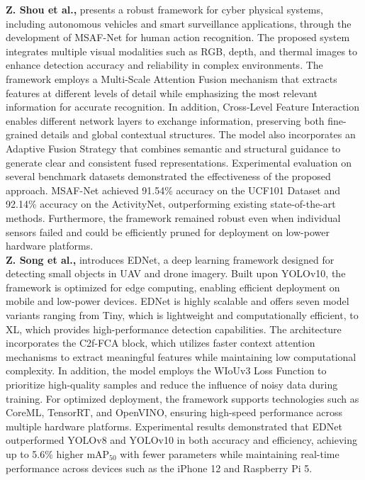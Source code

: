 \textbf{Z. Shou et al.,} presents a robust framework for cyber physical systems, including autonomous vehicles and smart surveillance applications, through the development of MSAF-Net for human action recognition. The proposed system integrates multiple visual modalities such as RGB, depth, and thermal images to enhance detection accuracy and reliability in complex environments. The framework employs a Multi-Scale Attention Fusion mechanism that extracts features at different levels of detail while emphasizing the most relevant information for accurate recognition. In addition, Cross-Level Feature Interaction enables different network layers to exchange information, preserving both fine-grained details and global contextual structures. The model also incorporates an Adaptive Fusion Strategy that combines semantic and structural guidance to generate clear and consistent fused representations. Experimental evaluation on several benchmark datasets demonstrated the effectiveness of the proposed approach. MSAF-Net achieved 91.54\% accuracy on the UCF101 Dataset and 92.14\% accuracy on the ActivityNet, outperforming existing state-of-the-art methods. Furthermore, the framework remained robust even when individual sensors failed and could be efficiently pruned for deployment on low-power hardware platforms. \textbf{\cite{supplementary_paper_6}} \\

\textbf{Z. Song et al.,} introduces EDNet, a deep learning framework designed for detecting small objects in UAV and drone imagery. Built upon YOLOv10, the framework is optimized for edge computing, enabling efficient deployment on mobile and low-power devices. EDNet is highly scalable and offers seven model variants ranging from Tiny, which is lightweight and computationally efficient, to XL, which provides high-performance detection capabilities. The architecture incorporates the C2f-FCA block, which utilizes faster context attention mechanisms to extract meaningful features while maintaining low computational complexity. In addition, the model employs the WIoUv3 Loss Function to prioritize high-quality samples and reduce the influence of noisy data during training. For optimized deployment, the framework supports technologies such as CoreML, TensorRT, and OpenVINO, ensuring high-speed performance across multiple hardware platforms. Experimental results demonstrated that EDNet outperformed YOLOv8 and YOLOv10 in both accuracy and efficiency, achieving up to 5.6\% higher mAP$_{50}$ with fewer parameters while maintaining real-time performance across devices such as the iPhone 12 and Raspberry Pi 5. \textbf{\cite{supplementary_paper_7}} \\

